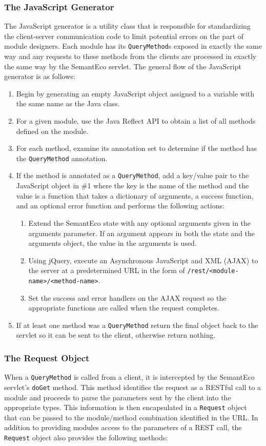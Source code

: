 \documentclass[letterpaper]{report}
\begin{document}
\subsubsection{The JavaScript Generator}
The JavaScript generator is a utility class that is responsible for standardizing the client-server communication code to limit potential errors on the part of module designers. Each module has its \texttt{QueryMethod}s exposed in exactly the same way and any requests to these methods from the clients are processed in exactly the same way by the SemantEco servlet. The general flow of the JavaScript generator is as follows:

\begin{enumerate}
\item Begin by generating an empty JavaScript object assigned to a variable with the same name as the Java class.
\item For a given module, use the Java Reflect API to obtain a list of all methods defined on the module.
\item For each method, examine its annotation set to determine if the method has the \texttt{QueryMethod} annotation.
\item If the method is annotated as a \texttt{QueryMethod}, add a key/value pair to the JavaScript object in \#1 where the key is the name of the method and the value is a function that takes a dictionary of arguments, a success function, and an optional error function and performs the following actions:
\begin{enumerate}
\item Extend the SemantEco state with any optional arguments given in the arguments parameter. If an argument appears in both the state and the arguments object, the value in the arguments is used.
\item Using jQuery, execute an Asynchronous JavaScript and XML (AJAX) to the server at a predetermined URL in the form of \texttt{/rest/<module-name>/<method-name>}.
\item Set the success and error handlers on the AJAX request so the appropriate functions are called when the request completes.
\end{enumerate}
\item If at least one method was a \texttt{QueryMethod} return the final object back to the servlet so it can be sent to the client, otherwise return nothing.
\end{enumerate}

\subsubsection{The Request Object}
\label{request-object}
When a \texttt{QueryMethod} is called from a client, it is intercepted by the SemantEco servlet's \texttt{doGet} method. This method identifies the request as a RESTful call to a module and proceeds to parse the parameters sent by the client into the appropriate types. This information is then encapsulated in a \texttt{Request} object that can be passed to the module/method combination identified in the URL. In addition to providing modules access to the parameters of a REST call, the \texttt{Request} object also provides the following methods:
\end{document}
